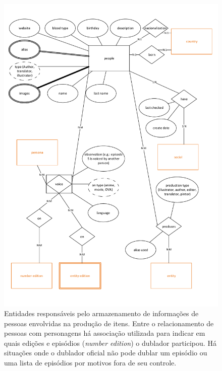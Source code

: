 \documentclass[12pt]{article}
\begin{document}
\begin{figure}[H]
\centering
\includegraphics[height=0.92\textheight,width=1\textwidth]{MER_-_People.pdf}
\caption{Entidades responsáveis pelo armazenamento de informações de pessoas envolvidas na produção de itens. Entre o relacionamento de pessoas com personagens há associação utilizada para indicar em quais edições e episódios (\textit{number edition}) o dublador participou. Há situações onde o dublador oficial não pode dublar um episódio ou uma lista de episódios por motivos fora de seu controle.} \label{hash}
\end{figure}
\end{document}
